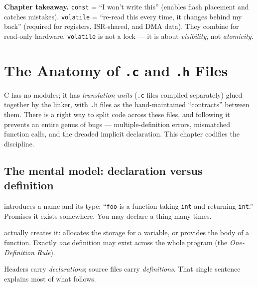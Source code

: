 \documentclass[11pt,a4paper,oneside]{book}
\newcommand{\code}[1]{\texttt{#1}}
\begin{document}
\begin{keyidea}
\textbf{Chapter takeaway.} \code{const} = ``I won't write this'' (enables flash
placement and catches mistakes). \code{volatile} = ``re-read this every time, it
changes behind my back'' (required for registers, ISR-shared, and DMA data). They
combine for read-only hardware. \code{volatile} is not a lock --- it is about
\emph{visibility}, not \emph{atomicity}.
\end{keyidea}

\chapter{The Anatomy of \texttt{.c} and \texttt{.h} Files}
\label{ch:files}

C has no modules; it has \emph{translation units} (\code{.c} files compiled
separately) glued together by the linker, with \code{.h} files as the
hand-maintained ``contracts'' between them. There is a right way to split code
across these files, and following it prevents an entire genus of bugs ---
multiple-definition errors, mismatched function calls, and the dreaded implicit
declaration. This chapter codifies the discipline.

\section{The mental model: declaration versus definition}
\begin{description}[leftmargin=1.6cm,style=nextline]
  \item[Declaration] introduces a name and its type: ``\code{foo} is a function
        taking \code{int} and returning \code{int}.'' Promises it exists
        somewhere. You may declare a thing many times.
  \item[Definition] actually creates it: allocates the storage for a variable,
        or provides the body of a function. Exactly \emph{one} definition may
        exist across the whole program (the \emph{One-Definition Rule}).
\end{description}
Headers carry \emph{declarations}; source files carry \emph{definitions}. That
single sentence explains most of what follows.
\end{document}
